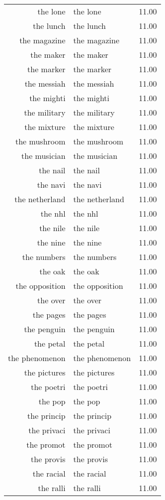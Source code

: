 \begin{table}[ht]
\begin{tabular}{rlr}
  the lone & the lone & 11.00 \\ 
  the lunch & the lunch & 11.00 \\ 
  the magazine & the magazine & 11.00 \\ 
  the maker & the maker & 11.00 \\ 
  the marker & the marker & 11.00 \\ 
  the messiah & the messiah & 11.00 \\ 
  the mighti & the mighti & 11.00 \\ 
  the military & the military & 11.00 \\ 
  the mixture & the mixture & 11.00 \\ 
  the mushroom & the mushroom & 11.00 \\ 
  the musician & the musician & 11.00 \\ 
  the nail & the nail & 11.00 \\ 
  the navi & the navi & 11.00 \\ 
  the netherland & the netherland & 11.00 \\ 
  the nhl & the nhl & 11.00 \\ 
  the nile & the nile & 11.00 \\ 
  the nine & the nine & 11.00 \\ 
  the numbers & the numbers & 11.00 \\ 
  the oak & the oak & 11.00 \\ 
  the opposition & the opposition & 11.00 \\ 
  the over & the over & 11.00 \\ 
  the pages & the pages & 11.00 \\ 
  the penguin & the penguin & 11.00 \\ 
  the petal & the petal & 11.00 \\ 
  the phenomenon & the phenomenon & 11.00 \\ 
  the pictures & the pictures & 11.00 \\ 
  the poetri & the poetri & 11.00 \\ 
  the pop & the pop & 11.00 \\ 
  the princip & the princip & 11.00 \\ 
  the privaci & the privaci & 11.00 \\ 
  the promot & the promot & 11.00 \\ 
  the provis & the provis & 11.00 \\ 
  the racial & the racial & 11.00 \\ 
  the ralli & the ralli & 11.00 \\ 

\end{tabular}
\end{table}
